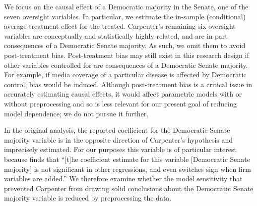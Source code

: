 \documentclass[11pt,titlepage]{article}
\begin{document}
We focus on the causal effect of a Democratic majority in the Senate,
one of the seven oversight variables. In particular, we estimate the
in-sample (conditional) average treatment effect for the treated.
Carpenter's remaining six oversight variables are conceptually and
statistically highly related, and are in part consequences of a
Democratic Senate majority.  As such, we omit them to avoid
post-treatment bias.  Post-treatment bias may still exist in this
research design if other variables controlled for are consequences of
a Democratic Senate majority.  For example, if media coverage of a
particular disease is affected by Democratic control, bias would be
induced.  Although post-treatment bias is a critical issue in
accurately estimating causal effects, it would affect parametric
models with or without preprocessing and so is less relevant for our
present goal of reducing model dependence; we do not pursue it
further.


In the original analysis, the reported coefficient for the Democratic
Senate majority variable is in the opposite direction of Carpenter's
hypothesis and imprecisely estimated.  For our purposes this variable
is of particular interest because \citet[p. 498]{Carpenter02} finds
that ``[t]he coefficient estimate for this variable [Democratic Senate
majority] is not significant in other regressions, and even switches
sign when firm variables are added.''  We therefore examine whether
the model sensitivity that prevented Carpenter from drawing solid
conclusions about the Democratic Senate majority variable is reduced
by preprocessing the data.
\end{document}
